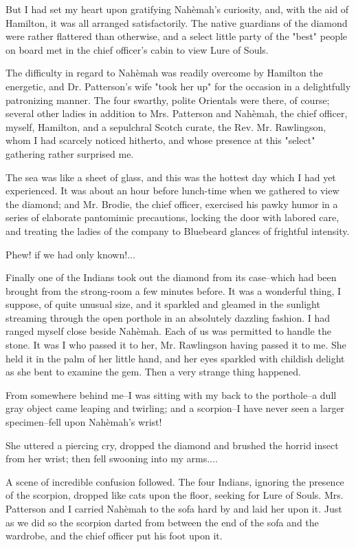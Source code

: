 But I had set my heart upon gratifying Nahèmah's curiosity, and, with
the aid of Hamilton, it was all arranged satisfactorily. The native
guardians of the diamond were rather flattered than otherwise, and a
select little party of the "best" people on board met in the chief
officer's cabin to view Lure of Souls.

The difficulty in regard to Nahèmah was readily overcome by Hamilton
the energetic, and Dr. Patterson's wife "took her up" for the occasion
in a delightfully patronizing manner. The four swarthy, polite
Orientals were there, of course; several other ladies in addition to
Mrs. Patterson and Nahèmah, the chief officer, myself, Hamilton, and a
sepulchral Scotch curate, the Rev. Mr. Rawlingson, whom I had scarcely
noticed hitherto, and whose presence at this "select" gathering rather
surprised me.

The sea was like a sheet of glass, and this was the hottest day which
I had yet experienced. It was about an hour before lunch-time when we
gathered to view the diamond; and Mr. Brodie, the chief officer,
exercised his pawky humor in a series of elaborate pantomimic
precautions, locking the door with labored care, and treating the
ladies of the company to Bluebeard glances of frightful intensity.

Phew! if we had only known!...

Finally one of the Indians took out the diamond from its case--which
had been brought from the strong-room a few minutes before. It was a
wonderful thing, I suppose, of quite unusual size, and it sparkled and
gleamed in the sunlight streaming through the open porthole in an
absolutely dazzling fashion. I had ranged myself close beside Nahèmah.
Each of us was permitted to handle the stone. It was I who passed it
to her, Mr. Rawlingson having passed it to me. She held it in the palm
of her little hand, and her eyes sparkled with childish delight as she
bent to examine the gem. Then a very strange thing happened.

From somewhere behind me--I was sitting with my back to the
porthole--a dull gray object came leaping and twirling; and a
scorpion--I have never seen a larger specimen--fell upon Nahèmah's
wrist!

She uttered a piercing cry, dropped the diamond and brushed the horrid
insect from her wrist; then fell swooning into my arms....

A scene of incredible confusion followed. The four Indians, ignoring
the presence of the scorpion, dropped like cats upon the floor,
seeking for Lure of Souls. Mrs. Patterson and I carried Nahèmah to
the sofa hard by and laid her upon it. Just as we did so the scorpion
darted from between the end of the sofa and the wardrobe, and the
chief officer put his foot upon it.

